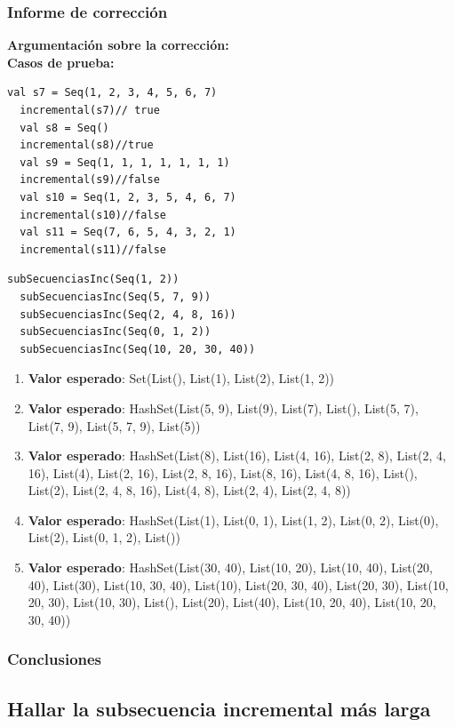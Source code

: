 \documentclass[12pt, a4paper]{article}
\begin{document}
\subsubsection{Informe de corrección}
\textbf{Argumentación sobre la corrección: \\}
\textbf{Casos de prueba: \\}
\begin{lstlisting}[caption=Casos de prueba para la función incremental, label=lst:scala_code]
  val s7 = Seq(1, 2, 3, 4, 5, 6, 7)
  incremental(s7)// true
  val s8 = Seq()
  incremental(s8)//true
  val s9 = Seq(1, 1, 1, 1, 1, 1, 1)
  incremental(s9)//false
  val s10 = Seq(1, 2, 3, 5, 4, 6, 7)
  incremental(s10)//false
  val s11 = Seq(7, 6, 5, 4, 3, 2, 1)
  incremental(s11)//false
\end{lstlisting}
\begin{lstlisting}[caption=Casos de prueba para la función subSecuenciasInc, label=lst:scala_code]
  subSecuenciasInc(Seq(1, 2))
  subSecuenciasInc(Seq(5, 7, 9))
  subSecuenciasInc(Seq(2, 4, 8, 16))
  subSecuenciasInc(Seq(0, 1, 2))
  subSecuenciasInc(Seq(10, 20, 30, 40))
\end{lstlisting}
\begin{enumerate}
  \item \textbf{Valor esperado}: Set(List(), List(1), List(2), List(1, 2))
  \item \textbf{Valor esperado}: HashSet(List(5, 9), List(9), List(7), List(), List(5, 7), List(7, 9), List(5, 7, 9), List(5))
  \item \textbf{Valor esperado}: HashSet(List(8), List(16), List(4, 16), List(2, 8), List(2, 4, 16), List(4), List(2, 16), List(2, 8, 16), List(8, 16), List(4, 8, 16), List(), List(2), List(2, 4, 8, 16), List(4, 8), List(2, 4), List(2, 4, 8))
  \item \textbf{Valor esperado}: HashSet(List(1), List(0, 1), List(1, 2), List(0, 2), List(0), List(2), List(0, 1, 2), List())
  \item \textbf{Valor esperado}: HashSet(List(30, 40), List(10, 20), List(10, 40), List(20, 40), List(30), List(10, 30, 40), List(10), List(20, 30, 40), List(20, 30), List(10, 20, 30), List(10, 30), List(), List(20), List(40), List(10, 20, 40), List(10, 20, 30, 40))
\end{enumerate}
\subsubsection{Conclusiones}
\subsection{Hallar la subsecuencia incremental más larga}
\end{document}
